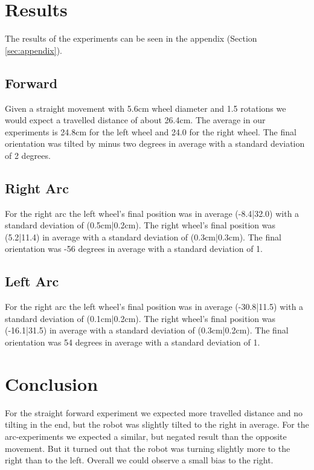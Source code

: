 \documentclass[paper=a4, fontsize=11pt]{scrartcl} %
\numberwithin{equation}{section} %
\numberwithin{figure}{section} %
\numberwithin{table}{section} %
\begin{document}
\section{Results}
The results of the experiments can be seen in the appendix (Section \ref{sec:appendix}).




\subsection{Forward}
Given a straight movement with 5.6cm wheel diameter and 1.5 rotations we would expect a travelled distance of about 26.4cm.
The average in our experiments is 24.8cm for the left wheel and 24.0 for the right wheel.
The final orientation was tilted by minus two degrees in average with a standard deviation of 2 degrees.


\subsection{Right Arc}
For the right arc the left wheel's final position was in average (-8.4|32.0) with a standard deviation of (0.5cm|0.2cm).
The right wheel's final position was (5.2|11.4) in average with a standard deviation of (0.3cm|0.3cm).
The final orientation was -56 degrees in average with a standard deviation of 1.

\subsection{Left Arc}
For the right arc the left wheel's final position was in average (-30.8|11.5) with a standard deviation of (0.1cm|0.2cm).
The right wheel's final position was (-16.1|31.5) in average with a standard deviation of (0.3cm|0.2cm).
The final orientation was 54 degrees in average with a standard deviation of 1.

\section{Conclusion}
For the straight forward experiment we expected more travelled distance and no tilting in the end, but the robot was slightly tilted to the right in average.
For the arc-experiments we expected a similar, but negated result than the opposite movement.
But it turned out that the robot was turning slightly more to the right than to the left.
Overall we could observe a small bias to the right.
\end{document}
